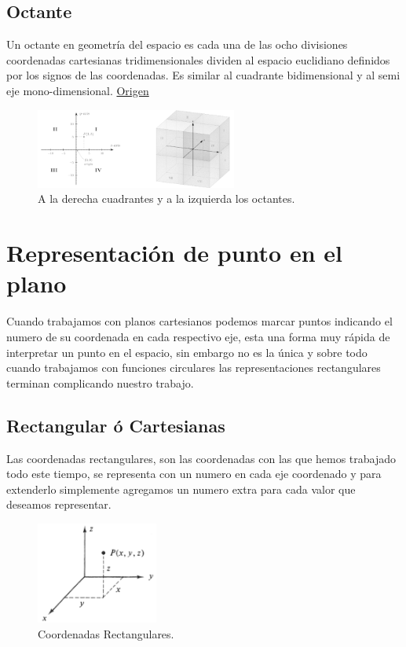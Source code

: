\documentclass{article}
\begin{document}
\subsection{Octante}
\label{sec:org28404b9}
Un octante en geometría del espacio es cada una de las ocho divisiones coordenadas cartesianas tridimensionales dividen al espacio euclidiano definidos por los signos de las coordenadas. Es similar al cuadrante bidimensional y al semi eje mono-dimensional. \href{https://es.wikipedia.org/wiki/Octante\_(geometr\%C3\%ADa)}{Origen}

\begin{figure}[htbp]
\centering
\includegraphics[width=250px]{img/cuadrante-y-octante-2.png}
\caption{A la derecha cuadrantes y a la izquierda los octantes.}
\end{figure}


\section{Representación de punto en el plano}
\label{sec:org97a839d}
Cuando trabajamos con planos cartesianos podemos marcar puntos indicando el numero de su coordenada en cada respectivo eje, esta una forma muy rápida de interpretar un punto en el espacio, sin embargo no es la única y sobre todo cuando trabajamos con funciones circulares las representaciones rectangulares terminan complicando nuestro trabajo.

\subsection{Rectangular ó Cartesianas}
\label{sec:orgbba2779}
Las coordenadas rectangulares, son las coordenadas con las que hemos trabajado todo este tiempo, se representa con un numero en cada eje coordenado y para extenderlo simplemente agregamos un numero extra para cada valor que deseamos representar. 

\begin{figure}[htbp]
\centering
\includegraphics[width=4cm]{img/coordenadas-cartesianas.png}
\caption{Coordenadas Rectangulares.}
\end{figure}
\end{document}
